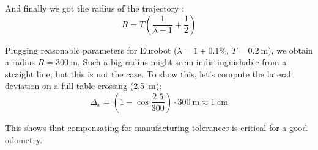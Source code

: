 \documentclass[a4paper]{IEEEtran}
\begin{document}
And finally we got the radius of the trajectory :
\begin{equation}
    R = T \left(\frac{1}{\lambda - 1}  + \frac{1}{2}\right)
\end{equation}

Plugging reasonable parameters for Eurobot ($\lambda=1+0.1\%$, $T = \SI{0.2}{\meter}$), we obtain a radius $R = \SI{300}{\meter}$. 
Such a big radius might seem indistinguishable from a straight line, but this is not the case.
To show this, let's compute the lateral deviation on a full table crossing (\SI{2.5}{\meter}):
\begin{equation}
    \Delta_x = \left( 1 - \cos \frac{2.5}{300} \right) \cdot \SI{300}{\meter} \approx \SI{1}{\centi\meter}
\end{equation}

This shows that compensating for manufacturing tolerances is critical for a good odometry.
\end{document}
